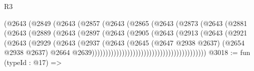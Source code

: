 \begin{lexlean}{R3}
\begin{coremodule}
                                    (@2643
                                      (@2849
                                        (@2643
                                          (@2857
                                            (@2643
                                              (@2865
                                                (@2643
                                                  (@2873
                                                    (@2643
                                                      (@2881
                                                        (@2643
                                                          (@2889
                                                            (@2643
                                                              (@2897
                                                                (@2643
                                                                  (@2905
                                                                    (@2643
                                                                      (@2913
                                                                        (@2643
                                                                          (@2921
                                                                            (@2643
                                                                              (@2929
                                                                                (@2643
                                                                                  (@2937
                                                                                    (@2643
                                                                                      (@2645
                                                                                        (@2647
                                                                                          @2938
                                                                                          @2637)
                                                                                        (@2654
                                                                                          @2938
                                                                                          @2637)
                                                                                        @2664
                                                                                        @2639))))))))))))))))))))))))))))))))))))))))))
@3018 := fun (typeId : @17) =>

\end{coremodule}
\end{lexlean}
